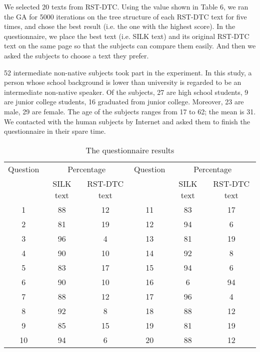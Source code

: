 \documentclass[english]{jnlp_1.2.0}
\begin{document}
We selected 20 texts from RST-DTC. Using the value shown in Table 6, 
we ran the GA for 5000 iterations on the tree structure of each RST-DTC 
text for five times, and chose the best result 
(i.e. the one with the highest score). In the questionnaire, we place 
the best text (i.e. SILK text) and its original RST-DTC text on 
the same page so that the subjects can compare them easily. 
And then we asked the subjects to choose a text they prefer. 

52 intermediate non-native subjects took part in the experiment. 
In this study, a person whose school background is lower than university
is regarded to be an intermediate non-native speaker. Of the subjects,
27 are high school students, 9 are junior college students, 16 
graduated from junior college. Moreover, 23 are male, 29 are female.
The age of the subjects ranges from 17 to 62; the mean is 31. 
We contacted with the human subjects by Internet and asked them 
to finish the questionnaire in their spare time.

\begin{table}[b]
\caption{The questionnaire results} 
\begin{center}
 \begin{tabular}{|c|c|c||c|c|c|}               \hline
 Question   & \multicolumn{2}{|c|}{Percentage} & Question & \multicolumn{2}{|c|}{Percentage} \\ \cline{2-3} \cline{5-6} 
           & SILK text & RST-DTC text         & & SILK text & RST-DTC text \\ \hline \hline
1         &   88     &  12       & 11   &  83    &  17   \\ \hline 
2         &   81     &  19       & 12   &  94    &   6   \\ \hline 
3         &   96     &   4       & 13   &  81    &  19   \\ \hline 
4         &   90     &  10       & 14   &  92    &   8   \\ \hline 
5         &   83     &  17       & 15   &  94    &   6   \\ \hline 
6         &   90     &  10       & 16   &   6    &  94   \\ \hline 
7         &   88     &  12       & 17   &  96    &   4   \\ \hline 
8         &   92     &   8       & 18   &  88    &  12   \\ \hline 
9         &   85     &  15       & 19   &  81    &  19   \\ \hline 
10        &   94     &   6       & 20   &  88    &  12   \\ \hline 
\end{tabular}
\end{center}
\end{table}
\end{document}
